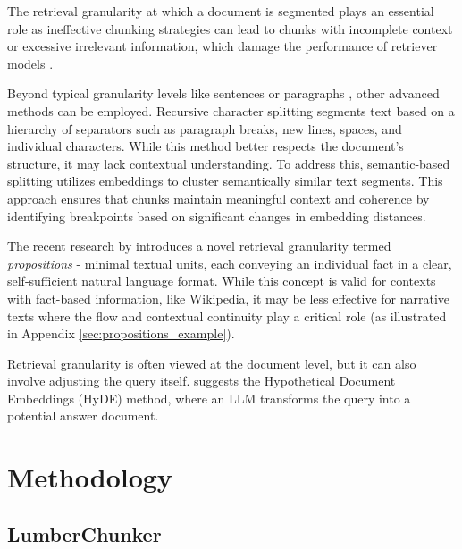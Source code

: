 The retrieval granularity at which a document is segmented plays an essential role as ineffective chunking strategies can lead to chunks with incomplete context or excessive irrelevant information, which damage the performance of retriever models \cite{llms_distracted_chain_of_note}.
\par
Beyond typical granularity levels like sentences or paragraphs \cite{RAG_survey}, other advanced methods can be employed. Recursive character splitting \cite{recursive} segments text based on a hierarchy of separators such as paragraph breaks, new lines, spaces, and individual characters. While this method better respects the document’s structure, it may lack contextual understanding. To address this, semantic-based splitting \cite{semantic_chunking} utilizes embeddings to cluster semantically similar text segments. This approach ensures that chunks maintain meaningful context and coherence by identifying breakpoints based on significant changes in embedding distances.
\par
The recent research by \citet{proposition_paper} introduces a novel retrieval granularity termed \textit{propositions} - minimal textual units, each conveying an individual fact in a clear, self-sufficient natural language format. While this concept is valid for contexts with fact-based information, like Wikipedia, it may be less effective for narrative texts where the flow and contextual continuity play a critical role (as illustrated in Appendix \ref{sec:propositions_example}).
\par
Retrieval granularity is often viewed at the document level, but it can also involve adjusting the query itself. \citet{hyde_paper} suggests the Hypothetical Document Embeddings (HyDE) method, where an LLM transforms the query into a potential answer document.



\section{Methodology}

\subsection{LumberChunker}

